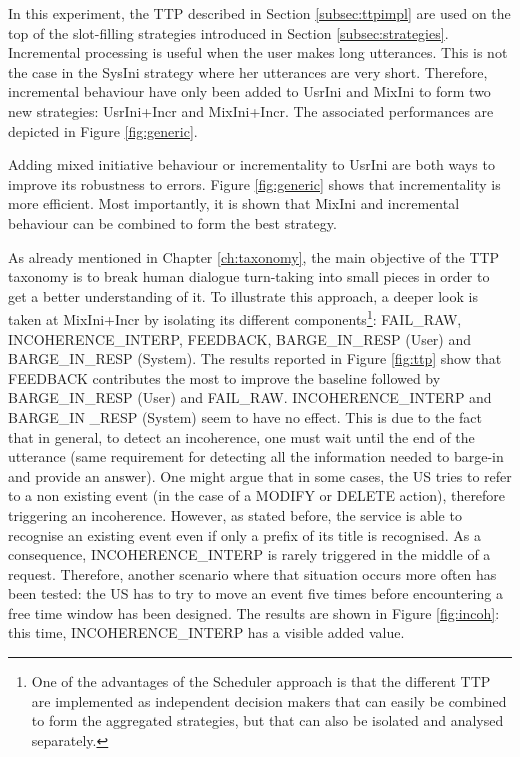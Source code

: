     	In this experiment, the TTP described in Section \ref{subsec:ttpimpl} are used on the top of the slot-filling strategies introduced in Section \ref{subsec:strategies}. Incremental processing is useful when the user makes long utterances. This is not the case in the SysIni strategy where her utterances are very short. Therefore, incremental behaviour have only been added to UsrIni and MixIni to form two new strategies: UsrIni+Incr and MixIni+Incr. The associated performances are depicted in Figure \ref{fig:generic}.
        
     	Adding mixed initiative behaviour or incrementality to UsrIni are both ways to improve its robustness to errors. Figure \ref{fig:generic} shows that incrementality is more efficient. Most importantly, it is shown that MixIni and incremental behaviour can be combined to form the best strategy.
    
    	As already mentioned in Chapter \ref{ch:taxonomy}, the main objective of the TTP taxonomy is to break human dialogue turn-taking into small pieces in order to get a better understanding of it. To illustrate this approach, a deeper look is taken at MixIni+Incr by isolating its different components\footnote{One of the advantages of the Scheduler approach is that the different TTP are implemented as independent decision makers that can easily be combined to form the aggregated strategies, but that can also be isolated and analysed separately.}: FAIL\_RAW, INCOHERENCE\_INTERP, FEEDBACK, BARGE\_IN\_RESP (User) and BARGE\_IN\_RESP (System). The results reported in Figure \ref{fig:ttp} show that FEEDBACK contributes the most to improve the baseline followed by BARGE\_IN\_RESP (User) and FAIL\_RAW. INCOHERENCE\_INTERP and BARGE\_IN \_RESP (System) seem to have no effect. This is due to the fact that in general, to detect an incoherence, one must wait until the end of the utterance (same requirement for detecting all the information needed to barge-in and provide an answer). One might argue that in some cases, the US tries to refer to a non existing event (in the case of a MODIFY or DELETE action), therefore triggering an incoherence. However, as stated before, the service is able to recognise an existing event even if only a prefix of its title is recognised. As a consequence, INCOHERENCE\_INTERP is rarely triggered in the middle of a request. Therefore, another scenario where that situation occurs more often has been tested: the US has to try to move an event five times before encountering a free time window has been designed. The results are shown in Figure \ref{fig:incoh}: this time, INCOHERENCE\_INTERP has a visible added value.
				
